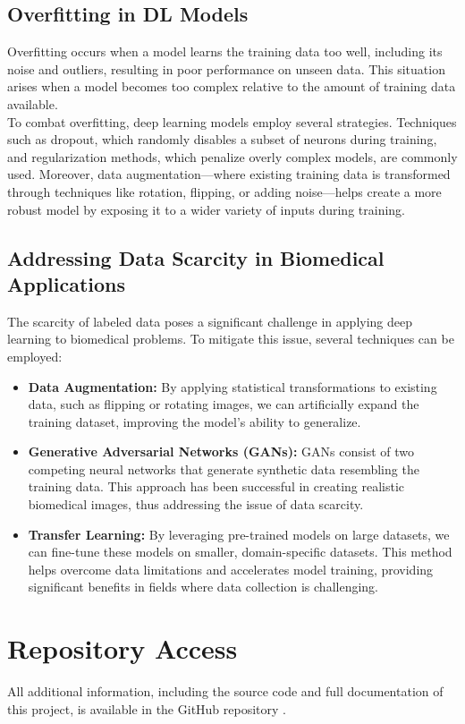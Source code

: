 \documentclass{article}
\begin{document}
\subsection{Overfitting in DL Models}
Overfitting occurs when a model learns the training data too well, including its noise and outliers, resulting in poor performance on unseen data. This situation arises when a model becomes too complex relative to the amount of training data available. 
\\

To combat overfitting, deep learning models employ several strategies. Techniques such as dropout, which randomly disables a subset of neurons during training, and regularization methods, which penalize overly complex models, are commonly used. Moreover, data augmentation—where existing training data is transformed through techniques like rotation, flipping, or adding noise—helps create a more robust model by exposing it to a wider variety of inputs during training.

\subsection{Addressing Data Scarcity in Biomedical Applications}
The scarcity of labeled data poses a significant challenge in applying deep learning to biomedical problems. To mitigate this issue, several techniques can be employed:

\begin{itemize}
	\item \textbf{Data Augmentation:} By applying statistical transformations to existing data, such as flipping or rotating images, we can artificially expand the training dataset, improving the model's ability to generalize.
	
	\item \textbf{Generative Adversarial Networks (GANs):} GANs consist of two competing neural networks that generate synthetic data resembling the training data. This approach has been successful in creating realistic biomedical images, thus addressing the issue of data scarcity.
	
	\item \textbf{Transfer Learning:} By leveraging pre-trained models on large datasets, we can fine-tune these models on smaller, domain-specific datasets. This method helps overcome data limitations and accelerates model training, providing significant benefits in fields where data collection is challenging.
\end{itemize}


\section{Repository Access}

All additional information, including the source code and full documentation of this project, is available in the GitHub repository \cite{cuevas2024github}.


\end{document}
